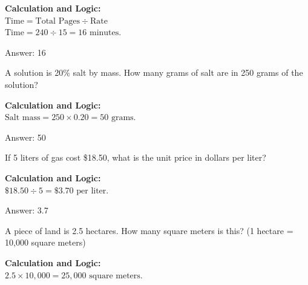 \documentclass[11pt,paper=a4,answers]{exam}
\begin{document}
\begin{questions}
\begin{solution}
\textbf{Calculation and Logic:} \\
$\text{Time} = \text{Total Pages} \div \text{Rate}$ \\
$\text{Time} = 240 \div 15 = 16 \text{ minutes}$.

\vspace{30pt}

Answer: \colorbox{yellow!100}{16}
\end{solution}

\vspace{60pt}

\question
A solution is 20\% salt by mass. How many grams of salt are in 250 grams of the solution?

\begin{solution}
\textbf{Calculation and Logic:} \\
$\text{Salt mass} = 250 \times 0.20 = 50 \text{ grams}$.

\vspace{30pt}

Answer: \colorbox{yellow!100}{50}
\end{solution}

\vspace{60pt}

\question
If 5 liters of gas cost \$18.50, what is the unit price in dollars per liter?

\begin{solution}
\textbf{Calculation and Logic:} \\
$\$18.50 \div 5 = \$3.70 \text{ per liter}$.

\vspace{30pt}

Answer: \colorbox{yellow!100}{3.7}
\end{solution}

\vspace{60pt}

\question
A piece of land is 2.5 hectares. How many square meters is this? (1 hectare = 10,000 square meters)

\begin{solution}
\textbf{Calculation and Logic:} \\
$2.5 \times 10,000 = 25,000 \text{ square meters}$.


\end{solution}
\end{questions}
\end{document}
